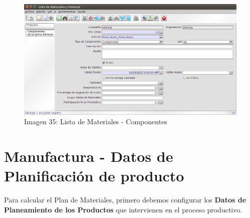 \documentclass[letterpaper,10pt,spanish]{sphinxmanual}
\begin{document}
\begin{figure}[htbp]
\centering
\capstart

\includegraphics{ly_ldm_2.png}
\caption{Imagen 35: Lista de Materiales - Componentes}\end{figure}


\section{Manufactura - Datos de Planificación de producto}
\label{manufactura-plan:manufactura-datos-de-planificacion-de-producto}\label{manufactura-plan::doc}
Para calcular el Plan de Materiales, primero debemos configurar los \textbf{Datos de Planeamiento de los Productos} que intervienen en el proceso productivo.
\end{document}
